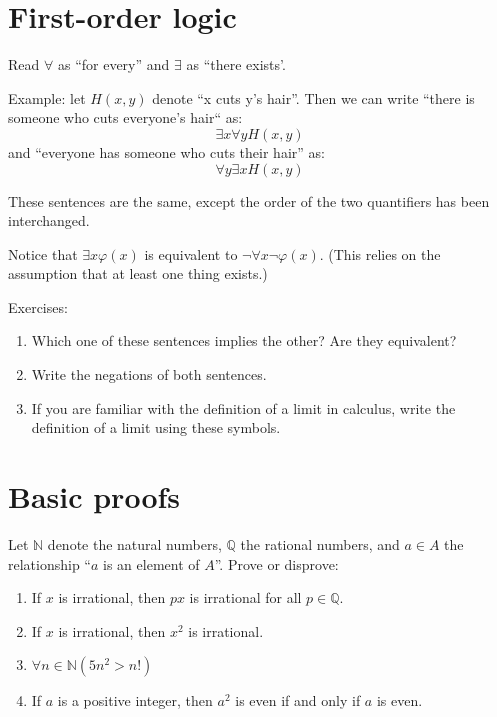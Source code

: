 \documentclass[letterpaper,12pt]{article}
\renewcommand{\phi}{\varphi}
\begin{document}
\newpage

\section{First-order logic}
Read $\forall$ as ``for every'' and $\exists$ as ``there exists'.

Example: let $H(x, y)$ denote ``x cuts y's hair''. Then we can write ``there is someone who cuts everyone's hair`` as:
$$\exists x \forall y H(x, y)$$
and ``everyone has someone who cuts their hair'' as:
$$\forall y \exists x H(x, y)$$

These sentences are the same, except the order of the two quantifiers has been interchanged.

Notice that $\exists x \phi(x)$ is equivalent to $\neg \forall x \neg \phi(x)$. (This relies on the assumption that at least one thing exists.)

Exercises:
\begin{enumerate}
\item
Which one of these sentences implies the other? Are they equivalent?
\item
Write the negations of both sentences.
\item
If you are familiar with the definition of a limit in calculus, write the definition of a limit using these symbols.
\end{enumerate}

\section{Basic proofs}
Let $\mathbb{N}$ denote the natural numbers, $\mathbb{Q}$ the rational numbers, and $a \in A$ the relationship ``$a$ is an element of $A$''. Prove or disprove:

\begin{enumerate}
\item
If $x$ is irrational, then $px$ is irrational for all $p \in \mathbb{Q}$.
\item
If $x$ is irrational, then $x^2$ is irrational.
\item
$\forall n \in \mathbb{N} (5n^2 > n!)$
\item
If $a$ is a positive integer, then $a^2$ is even if and only if $a$ is even.
\end{enumerate}
\end{document}
